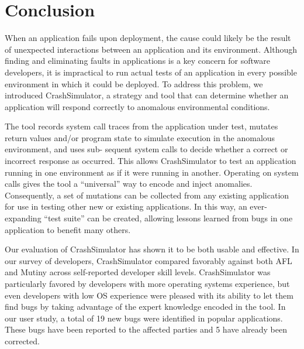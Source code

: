 \section{Conclusion}
\label{SEC:conclusion}

When an application fails upon deployment,
the cause could likely be the result
of unexpected interactions between
an application and its environment.  Although finding and eliminating
faults in applications is a key concern for software developers, it is
impractical to run actual tests  of an application in every possible
environment in
which it could be deployed.  To address this problem, we introduced
CrashSimulator, a strategy and tool
that can determine whether an application will
respond correctly to anomalous environmental conditions.

The tool records system call traces from the application under test,
mutates return values and/or program state to simulate execution in the
anomalous environment, and uses sub- sequent system calls to decide whether
a correct or incorrect response as occurred. This allows CrashSimulator to
test an application running in one environment as if it were running in
another. Operating on system calls gives the tool  a ``universal'' way to
encode and inject anomalies. Consequently, a set of mutations can be
collected from any existing application for use in testing other new or
existing applications. In this way, an ever-expanding ``test suite'' can be
created, allowing lessons learned from bugs in one application to benefit
many others.

Our evaluation of CrashSimulator has shown it to be both usable and
effective.  In our survey of developers, CrashSimulator compared favorably
against both AFL and Mutiny across self-reported developer skill levels.
CrashSimulator was particularly favored by developers with more operating
systems experience, but even developers with low OS experience were pleased
with its ability to let them find bugs by taking advantage of
the expert knowledge encoded in the tool.
In our user study, a total of
19 new bugs were identified in popular applications.
These bugs have been reported to the
affected parties and 5 have already been corrected.


